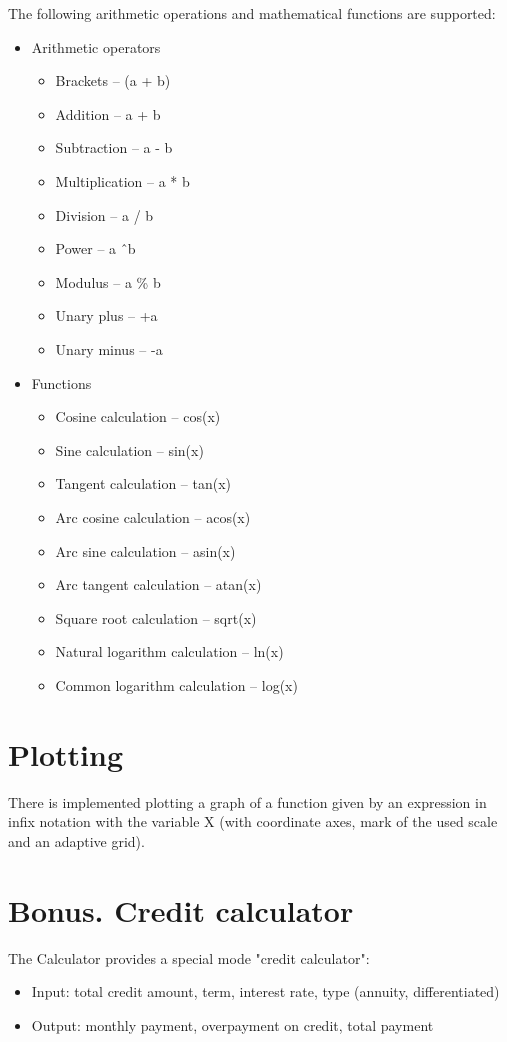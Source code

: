 \documentclass{article}
\begin{document}
The following arithmetic operations and mathematical functions are supported:
  \begin{itemize}
    \item Arithmetic operators
    \begin{itemize}
      \item Brackets -- (a + b)
      \item Addition -- a + b
      \item Subtraction -- a - b
      \item Multiplication -- a * b
      \item Division -- a / b
      \item Power -- a \^\ b
      \item Modulus -- a \% b
      \item Unary plus -- +a
      \item Unary minus -- -a
    \end{itemize}
    \item Functions
    \begin{itemize}
      \item Cosine calculation -- cos(x)
      \item Sine calculation -- sin(x)
      \item Tangent calculation -- tan(x)
      \item Arc cosine calculation -- acos(x)
      \item Arc sine calculation -- asin(x)
      \item Arc tangent calculation -- atan(x)
      \item Square root calculation -- sqrt(x)
      \item Natural logarithm calculation -- ln(x)
      \item Common logarithm calculation -- log(x)
    \end{itemize}
  \end{itemize}


\section{Plotting}

There is implemented plotting a graph of a function given by an expression in infix notation with the variable X (with coordinate axes, mark of the used scale and an adaptive grid).
\pagebreak
\section{Bonus. Credit calculator}
The Calculator provides a special mode "credit calculator":
  \begin{itemize}
    \item Input: total credit amount, term, interest rate, type (annuity, differentiated)
    \item Output: monthly payment, overpayment on credit, total payment
  \end{itemize}
\end{document}
